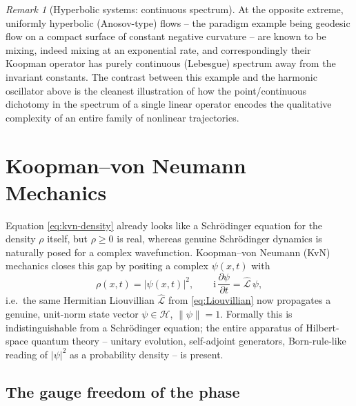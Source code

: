 \documentclass[11pt]{article}
\theoremstyle{remark}
\newtheorem{remark}[proposition]{Remark}
\newcommand{\CL}{\widehat{\mathcal{L}}}
\newcommand{\ii}{\mathrm{i}}
\begin{document}
\begin{remark}[Hyperbolic systems: continuous spectrum]
At the opposite extreme, uniformly hyperbolic (Anosov-type) flows -- the paradigm example being geodesic flow on a compact surface of constant negative curvature -- are known to be mixing, indeed mixing at an exponential rate, and correspondingly their Koopman operator has purely continuous (Lebesgue) spectrum away from the invariant constants. The contrast between this example and the harmonic oscillator above is the cleanest illustration of how the point/continuous dichotomy in the spectrum of a single linear operator encodes the qualitative complexity of an entire family of nonlinear trajectories.
\end{remark}

\section{Koopman--von Neumann Mechanics}
\label{sec:kvn}

Equation \eqref{eq:kvn-density} already looks like a Schr\"odinger equation for the density $\rho$ itself, but $\rho\ge0$ is real, whereas genuine Schr\"odinger dynamics is naturally posed for a complex wavefunction. Koopman--von Neumann (KvN) mechanics closes this gap by positing a complex $\psi(x,t)$ with
\begin{equation}
\rho(x,t) = |\psi(x,t)|^2, \qquad \ii\,\frac{\partial\psi}{\partial t} = \CL\,\psi,
\label{eq:kvn-psi}
\end{equation}
i.e.\ the same Hermitian Liouvillian $\CL$ from \eqref{eq:Liouvillian} now propagates a genuine, unit-norm state vector $\psi\in\mathcal H$, $\|\psi\|=1$. Formally this is indistinguishable from a Schr\"odinger equation; the entire apparatus of Hilbert-space quantum theory -- unitary evolution, self-adjoint generators, Born-rule-like reading of $|\psi|^2$ as a probability density -- is present.

\subsection{The gauge freedom of the phase}
\end{document}
